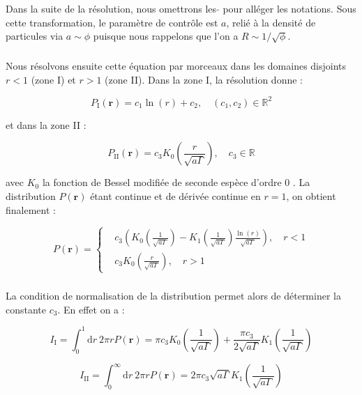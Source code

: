 \noindent Dans la suite de la résolution, nous omettrons les $\tilde{}$ pour alléger les notations. Sous cette transformation, le paramètre de contrôle est $a$, relié à la densité de particules via $a\sim \phi$ puisque nous rappelons que l'on a $R\sim 1/\sqrt{\phi}$.

\subparagraph{}Nous résolvons ensuite cette équation par morceaux dans les domaines disjoints $r<1$ (zone I) et $r>1$ (zone II). Dans la zone I, la résolution donne :

\begin{equation}
	P_\text{I}(\mathbf{r}) = c_1 \ln (r) + c_2, \quad (c_1, c_2) \in \mathbb{R}^2
\end{equation}

\noindent et dans la zone II :

\begin{equation}
	P_\text{II}(\mathbf{r}) = c_3 K_0\left( \frac{r}{\sqrt{a\Gamma}} \right), \quad c_3 \in \mathbb{R}
\end{equation}

\noindent avec $K_0$ la fonction de Bessel modifiée de seconde espèce d'ordre 0 \cite{abramowitz_handbook_1965}. La distribution $P(\mathbf{r})$ étant continue et de dérivée continue en $r=1$, on obtient finalement :

\begin{equation}
P(\mathbf{r}) = \left\{
    \begin{aligned}
    & c_3 \left( K_0\left( \frac{1}{\sqrt{a\Gamma}} \right) -K_1\left( \frac{1}{\sqrt{a\Gamma}} \right)\frac{\ln (r)}{\sqrt{a\Gamma}}\right), \quad r<1\\
    & c_3 K_0\left( \frac{r}{\sqrt{a\Gamma}} \right), \quad r>1
    \end{aligned}
    \right.
\end{equation}

\subparagraph{}La condition de normalisation de la distribution permet alors de déterminer la constante $c_3$. En effet on a :

\begin{equation}
	I_\text{I} = \int_0^1 \mathrm{d}r~ 2\pi r P(\mathbf{r}) = \pi c_3 K_0\left( \frac{1}{\sqrt{a\Gamma}} \right) + \frac{\pi c_3}{2\sqrt{a\Gamma}}K_1\left( \frac{1}{\sqrt{a\Gamma}} \right)
\end{equation}

\begin{equation}
	I_\text{II} = \int_0^\infty \mathrm{d}r~ 2\pi r P(\mathbf{r}) = 2\pi c_3 \sqrt{a\Gamma}K_1\left( \frac{1}{\sqrt{a\Gamma}} \right)
\end{equation}

